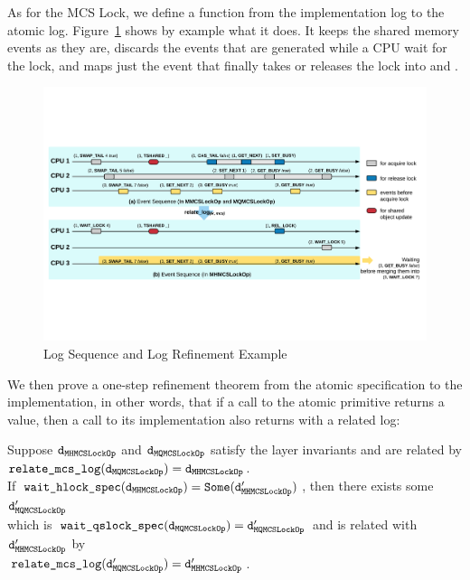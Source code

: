 As for the MCS Lock, we define a function  from the
implementation log to the atomic log. Figure~\ref{fig:chapter:mcslock:logsequence}
shows by example what it does. It keeps the shared memory events as
they are, discards the events that are generated while a CPU wait for
the lock, and maps just the event that finally takes or releases the
lock into  and .
\begin{figure}
\includegraphics[width=\textwidth]{figs/mcslock/logsequence}
\caption{Log Sequence and Log Refinement Example}
\label{fig:chapter:mcslock:logsequence}
\end{figure}

We then prove a one-step refinement theorem from the atomic specification 
to the implementation, in other words, that if a call to the atomic primitive returns a 
value, then a call to its implementation also returns with a related log:

\begin{theorem}
  \label{thm:chapter:mcslock:mcs_wait_lock_exist}

  Suppose ${\mathrm{\texttt{{d}}}}_{{\mathrm{\texttt{{MHMCSLockOp}}}}}$ and ${\mathrm{\texttt{{d}}}}_{{\mathrm{\texttt{{MQMCSLockOp}}}}}$ satisfy the layer
  invariants and are related by\\
   ${\mathrm{\texttt{{relate\_mcs\_log}}}}({\mathrm{\texttt{{d}}}}_{{\mathrm{\texttt{{{MQMCSLockOp}}}}}}) = 
  {\mathrm{\texttt{{d}}}}_{{\mathrm{\texttt{{MHMCSLockOp}}}}}$.\\
If ${\mathrm{\texttt{{wait\_hlock\_spec}}}}({\mathrm{\texttt{{d}}}}_{{\mathrm{\texttt{{MHMCSLockOp}}}}}) = {\mathrm{\texttt{{Some}}}}({\mathrm{\texttt{{d}}}}'_{{\mathrm{\texttt{{MHMCSLockOp}}}}})$, then there exists some ${\mathrm{\texttt{{d}}}}'_{{\mathrm{\texttt{{MQMCSLockOp}}}}}$\\
  which is ${\mathrm{\texttt{{wait\_qslock\_spec}}}}({\mathrm{\texttt{{d}}}}_{{\mathrm{\texttt{{MQMCSLockOp}}}}}) = {\mathrm{\texttt{{d}}}}'_{{\mathrm{\texttt{{MQMCSLockOp}}}}}$ and is related with ${\mathrm{\texttt{{d}}}}'_{{\mathrm{\texttt{{MHMCSLockOp}}}}}$
   by\\
 ${\mathrm{\texttt{{relate\_mcs\_log}}}}({\mathrm{\texttt{{d}}}}'_{{\mathrm{\texttt{{MQMCSLockOp}}}}}) = {\mathrm{\texttt{{d}}}}'_{{\mathrm{\texttt{{MHMCSLockOp}}}}}$.

\end{theorem}

